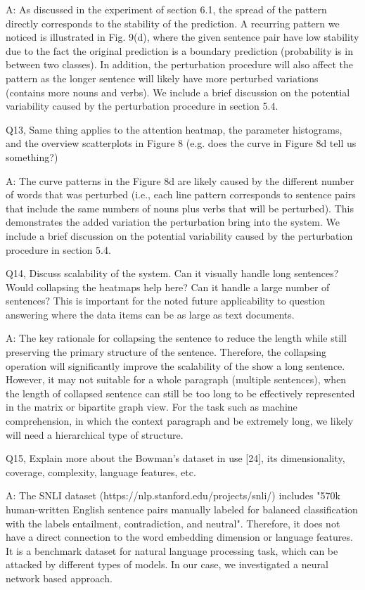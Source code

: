 A: As discussed in the experiment of section 6.1, the spread of the pattern directly corresponds to the stability of the prediction. A recurring pattern we noticed is illustrated in Fig. 9(d), where the given sentence pair have low stability due to the fact the original prediction is a boundary prediction (probability is in between two classes). In addition, the perturbation procedure will also affect the pattern as the longer sentence will likely have more perturbed variations (contains more nouns and verbs). We include a brief discussion on the potential variability caused by the perturbation procedure in section 5.4.

Q13, Same thing applies to the attention heatmap, the parameter histograms, and the overview scatterplots in Figure 8 (e.g. does the curve in Figure 8d tell us something?)

A: The curve patterns in the Figure 8d are likely caused by the different number of words that was perturbed (i.e., each line pattern corresponds to sentence pairs that include the same numbers of nouns plus verbs that will be perturbed). This demonstrates the added variation the perturbation bring into the system. We include a brief discussion on the potential variability caused by the perturbation procedure in section 5.4.

Q14, Discuss scalability of the system. Can it visually handle long sentences? Would collapsing the heatmaps help here? Can it handle a large number of sentences? This is important for the noted future applicability to question answering where the data items can be as large as text documents.

A: The key rationale for collapsing the sentence to reduce the length while still preserving the primary structure of the sentence. Therefore, the collapsing operation will significantly improve the scalability of the show a long sentence. However, it may not suitable for a whole paragraph (multiple sentences), when the length of collapsed sentence can still be too long to be effectively represented in the matrix or bipartite graph view. For the task such as machine comprehension, in which the context paragraph and be extremely long, we likely will need a hierarchical type of structure.

Q15, Explain more about the Bowman's dataset in use [24], its dimensionality, coverage, complexity, language features, etc.

A: The SNLI dataset (https://nlp.stanford.edu/projects/snli/) includes "570k human-written English sentence pairs manually labeled for balanced classification with the labels entailment, contradiction, and neutral". Therefore, it does not have a direct connection to the word embedding dimension or language features. It is a benchmark dataset for natural language processing task, which can be attacked by different types of models. In our case, we investigated a neural network based approach.

